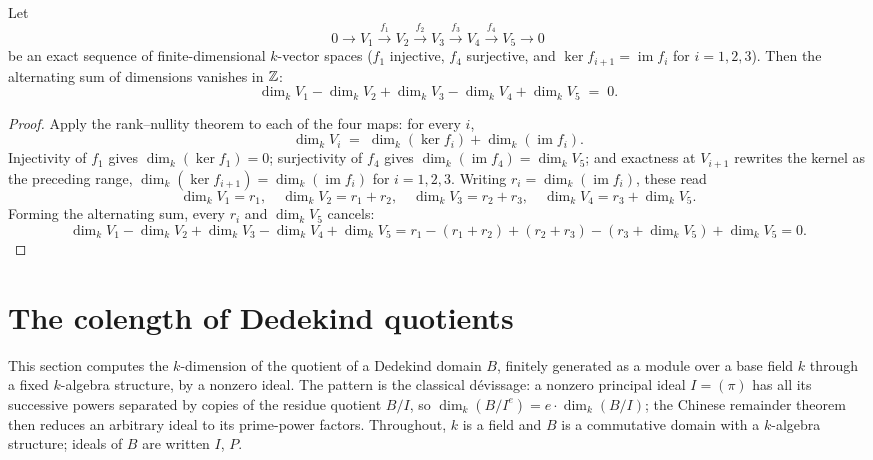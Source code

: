 \begin{theorem}
  \label{pa-thm:finrank_alt_sum_exact5}
  \leanok

  Let
  \[
    0 \longrightarrow V_1 \xrightarrow{\ f_1\ } V_2 \xrightarrow{\ f_2\ } V_3
      \xrightarrow{\ f_3\ } V_4 \xrightarrow{\ f_4\ } V_5 \longrightarrow 0
  \]
  be an exact sequence of finite-dimensional \(k\)-vector spaces (\(f_1\) injective, \(f_4\)
  surjective, and \(\ker f_{i+1} = \operatorname{im} f_i\) for \(i = 1, 2, 3\)). Then the
  alternating sum of dimensions vanishes in \(\mathbb{Z}\):
  \[
    \dim_k V_1 - \dim_k V_2 + \dim_k V_3 - \dim_k V_4 + \dim_k V_5 \;=\; 0 .
  \]
\end{theorem}
\begin{proof}
  \leanok
  Apply the rank--nullity theorem to each of the four maps: for every \(i\),
  \[
    \dim_k V_i \;=\; \dim_k(\ker f_i) + \dim_k(\operatorname{im} f_i) .
  \]
  Injectivity of \(f_1\) gives \(\dim_k(\ker f_1) = 0\); surjectivity of \(f_4\) gives
  \(\dim_k(\operatorname{im} f_4) = \dim_k V_5\); and exactness at \(V_{i+1}\) rewrites the
  kernel as the preceding range, \(\dim_k(\ker f_{i+1}) = \dim_k(\operatorname{im} f_i)\) for
  \(i = 1, 2, 3\). Writing \(r_i = \dim_k(\operatorname{im} f_i)\), these read
  \[
    \dim_k V_1 = r_1,\quad
    \dim_k V_2 = r_1 + r_2,\quad
    \dim_k V_3 = r_2 + r_3,\quad
    \dim_k V_4 = r_3 + \dim_k V_5 .
  \]
  Forming the alternating sum, every \(r_i\) and \(\dim_k V_5\) cancels:
  \[
    \dim_k V_1 - \dim_k V_2 + \dim_k V_3 - \dim_k V_4 + \dim_k V_5
      = r_1 - (r_1 + r_2) + (r_2 + r_3) - (r_3 + \dim_k V_5) + \dim_k V_5 = 0 .
  \]
\end{proof}

\section{The colength of Dedekind quotients}
\label{pa-sec:dedekind_colength}

This section computes the \(k\)-dimension of the quotient of a Dedekind domain \(B\), finitely
generated as a module over a base field \(k\) through a fixed \(k\)-algebra structure, by a
nonzero ideal. The pattern is the classical dévissage: a nonzero principal ideal
\(I = (\pi)\) has all its successive powers separated by copies of the residue quotient
\(B/I\), so \(\dim_k(B/I^e) = e \cdot \dim_k(B/I)\); the Chinese remainder theorem then reduces
an arbitrary ideal to its prime-power factors. Throughout, \(k\) is a field and \(B\) is a
commutative domain with a \(k\)-algebra structure; ideals of \(B\) are written \(I\), \(P\).

